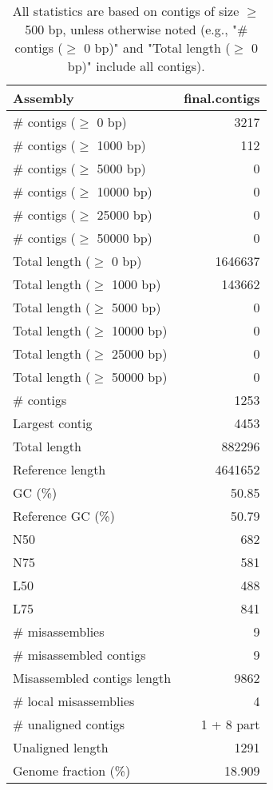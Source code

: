 \documentclass[12pt,a4paper]{article}
\begin{document}
\begin{table}[ht]
\begin{center}
\caption{All statistics are based on contigs of size $\geq$ 500 bp, unless otherwise noted (e.g., "\# contigs ($\geq$ 0 bp)" and "Total length ($\geq$ 0 bp)" include all contigs).}
\begin{tabular}{|l*{1}{|r}|}
\hline
Assembly & final.contigs \\ \hline
\# contigs ($\geq$ 0 bp) & 3217 \\ \hline
\# contigs ($\geq$ 1000 bp) & 112 \\ \hline
\# contigs ($\geq$ 5000 bp) & 0 \\ \hline
\# contigs ($\geq$ 10000 bp) & 0 \\ \hline
\# contigs ($\geq$ 25000 bp) & 0 \\ \hline
\# contigs ($\geq$ 50000 bp) & 0 \\ \hline
Total length ($\geq$ 0 bp) & 1646637 \\ \hline
Total length ($\geq$ 1000 bp) & 143662 \\ \hline
Total length ($\geq$ 5000 bp) & 0 \\ \hline
Total length ($\geq$ 10000 bp) & 0 \\ \hline
Total length ($\geq$ 25000 bp) & 0 \\ \hline
Total length ($\geq$ 50000 bp) & 0 \\ \hline
\# contigs & 1253 \\ \hline
Largest contig & 4453 \\ \hline
Total length & 882296 \\ \hline
Reference length & 4641652 \\ \hline
GC (\%) & 50.85 \\ \hline
Reference GC (\%) & 50.79 \\ \hline
N50 & 682 \\ \hline
N75 & 581 \\ \hline
L50 & 488 \\ \hline
L75 & 841 \\ \hline
\# misassemblies & 9 \\ \hline
\# misassembled contigs & 9 \\ \hline
Misassembled contigs length & 9862 \\ \hline
\# local misassemblies & 4 \\ \hline
\# unaligned contigs & 1 + 8 part \\ \hline
Unaligned length & 1291 \\ \hline
Genome fraction (\%) & 18.909 \\ \hline

\end{tabular}
\end{center}
\end{table}
\end{document}
